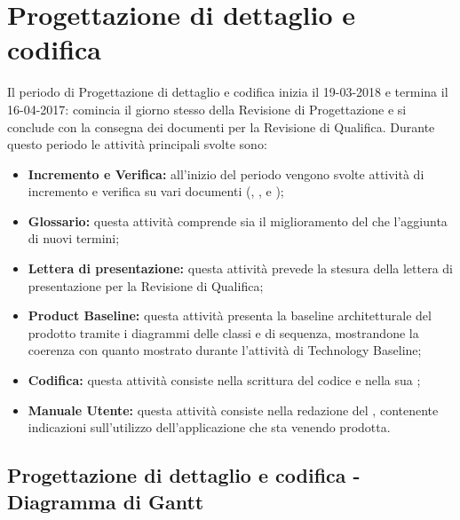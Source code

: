\documentclass[PianoDiProgetto.tex]{subfiles}
\begin{document}
\section{Progettazione di dettaglio e codifica}
Il periodo di Progettazione di dettaglio e codifica inizia il 19-03-2018 e termina il 16-04-2017: comincia il giorno stesso della Revisione di Progettazione e si conclude con la consegna dei documenti per la Revisione di Qualifica. Durante questo periodo le attività principali svolte sono:
\begin{itemize}
	\item \textbf{Incremento e Verifica:} all'inizio del periodo vengono svolte attività di incremento e verifica su vari documenti (\ndp, \pdp, \pdq e \tb);
	\item \textbf{Glossario:} questa attività comprende sia il miglioramento del \g che l'aggiunta di nuovi termini;
	\item \textbf{Lettera di presentazione:} questa attività prevede la stesura della lettera di presentazione per la Revisione di Qualifica;
	\item \textbf{Product Baseline:} questa attività presenta la baseline architetturale del prodotto tramite i  diagrammi delle classi e di sequenza, mostrandone la coerenza con quanto mostrato durante l'attività di Technology Baseline;
	\item \textbf{Codifica:} questa attività consiste nella scrittura del codice e nella sua ;
	\item \textbf{Manuale Utente:} questa attività consiste nella redazione del \mut, contenente indicazioni sull'utilizzo dell'applicazione che sta venendo prodotta.

\end{itemize}
\begin{landscape}
		\subsection{Progettazione di dettaglio e codifica - Diagramma di Gantt}
\end{landscape}
\end{document}
